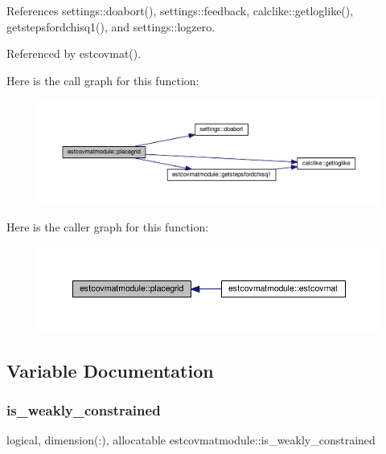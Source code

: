 References settings\+::doabort(), settings\+::feedback, calclike\+::getloglike(), getstepsfordchisq1(), and settings\+::logzero.



Referenced by estcovmat().

Here is the call graph for this function\+:
\nopagebreak
\begin{figure}[H]
\begin{center}
\leavevmode
\includegraphics[width=350pt]{namespaceestcovmatmodule_a2bc770f26c02a798aaf3ff8f2cc274aa_cgraph}
\end{center}
\end{figure}
Here is the caller graph for this function\+:
\nopagebreak
\begin{figure}[H]
\begin{center}
\leavevmode
\includegraphics[width=350pt]{namespaceestcovmatmodule_a2bc770f26c02a798aaf3ff8f2cc274aa_icgraph}
\end{center}
\end{figure}


\subsection{Variable Documentation}
\mbox{\label{namespaceestcovmatmodule_aae3649733742664790e565faa9dad010}} 
\subsubsection{\texorpdfstring{is\+\_\+weakly\+\_\+constrained}{is\_weakly\_constrained}}
{\footnotesize\ttfamily logical, dimension(\+:), allocatable estcovmatmodule\+::is\+\_\+weakly\+\_\+constrained}



